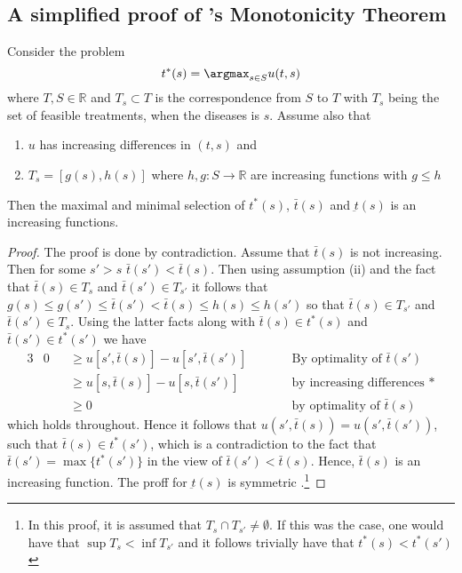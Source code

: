 \begin{appendices}
\subsection[A simplified proof of Topkis’s Monotonicity Theorem is]{A simplified proof of 's Monotonicity Theorem}\label{app:topiks-proof}
\begin{theorem}
	Consider the problem
	\[
		t^*(s)=\argmax_{s\in S} u(t,s)
	\]
	where \(T,S\in \mathbb{R}\) and \(T_s\subset T\) is the correspondence from \(S\) to \(T\)  with \(T_s\) being the set of feasible treatments, when the diseases is \(s\).  Assume also that
	\begin{enumerate}[label=(\roman*)]
		\item \(u\) has increasing differences in \((t,s)\)  and
		\item \(T_s=[g(s),h(s)]\)  where \(h,g:S \rightarrow \mathbb{R}\) are increasing functions with \(g\leq h\)
	\end{enumerate}
	Then the maximal and minimal selection of \(t^*(s)\), \(\bar{t}(s)\) and \(\underbar{t}(s)\) is an increasing functions.
\end{theorem}

\begin{proof}
	The proof is done by contradiction. Assume that \(\bar{t}(s)\) is not increasing. Then for some \(s'>s\)  \(\bar{t}(s')<\bar{t}(s)\).  Then using assumption (ii) and the fact that \(\bar{t}(s)\in T_s\)  and \(\bar{t}(s')\in T_{s'}\)  it follows that \(g(s)\leq g(s')\leq \bar{t}(s') < \bar{t}(s) \leq h(s) \leq h(s')\)  so that \(\bar{t}(s)\in T_{s'}\) and \(\bar{t}(s')\in T_s\).  Using the latter facts along with \(\bar{t}(s)\in t^*(s)\) and \(\bar{t}(s')\in t^*(s')\)  we have
	\begin{alignat*}{3}
	   & 0 && \geq u[s',\bar{t}(s)]-u[s',\bar{t}(s')] && \qquad \text{By optimality of } \bar{t}(s') \\
	   &   && \geq u[s,\bar{t}(s)]-u[s,\bar{t}(s')]   && \qquad \text{by increasing differences *} \\
	   &   && \geq 0                                  && \qquad \text{by optimality of } \bar{t}(s)
	\end{alignat*}
	which holds throughout. Hence it follows that \(u(s',\bar{t}(s))=u(s',\bar{t}(s'))\), such that \(\bar{t}(s)\in t^*(s')\), which is a contradiction to the fact that \(\bar{t}(s')=\max \{t^*(s')\}\) in the view of \(\bar{t}(s')<\bar{t}(s)\).  Hence, \(\bar{t}(s)\) is an increasing function. The proff for \(\underbar{t}(s)\) is symmetric \parencite{Amir2005}.\footnote{In this proof, it is assumed that \(T_s\cap T_{s'}\ne \emptyset\). If this was the case, one would have that \(\sup T_s < \inf T_{s'}\) and it follows trivially have that \(t^*(s)<t^*(s')\)}
\end{proof}

\end{appendices}
